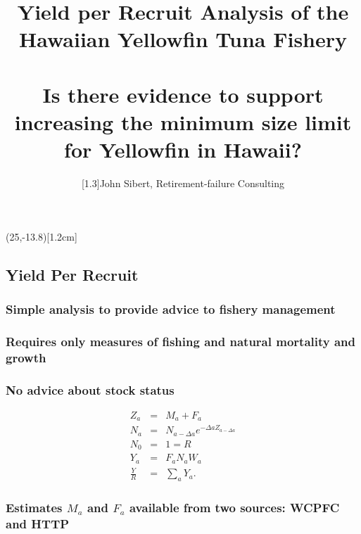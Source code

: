 \documentclass[a4paper,KOMA,landscape,titlepage]{powersem}
\begin{document}
\pageTransitionReplace
\pagecounter[on]


\freelogo(25,-13.8)[1.2cm] %

\author{\scalebox{1}[1.3]{John Sibert, Retirement-failure Consulting}} 
\title{Yield per Recruit Analysis of the Hawaiian
Yellowfin Tuna Fishery\\~\\
{\Large \color{section3}
Is there evidence to support increasing the minimum size limit for
Yellowfin in Hawaii?}}
\address{\href{mailto:sibert@hawaii.edu}{sibert@hawaii.edu}}
\begin{slide}
\maketitle
\end{slide}
\centerslidesfalse
\begin{slide}\section{Yield Per Recruit}
\subsubsection{Simple analysis to provide advice to fishery management}
\subsubsection{Requires only measures of fishing and natural
mortality and growth}
\subsubsection{No advice about stock status}
\begin{eqnarray}
Z_a &=& M_a +F_a \\
N_a &=& N_{a-\Delta a}e^{-\Delta aZ_{a-\Delta a}}\\
N_0 &=& 1 = R\\
Y_a &=& F_aN_aW_a\\
\frac{Y}{R} &=& \sum_a Y_a.
\end{eqnarray}
\subsubsection{Estimates $M_a$ and $F_a$ available from two sources:
WCPFC and HTTP}
\end{slide}
\end{document}
